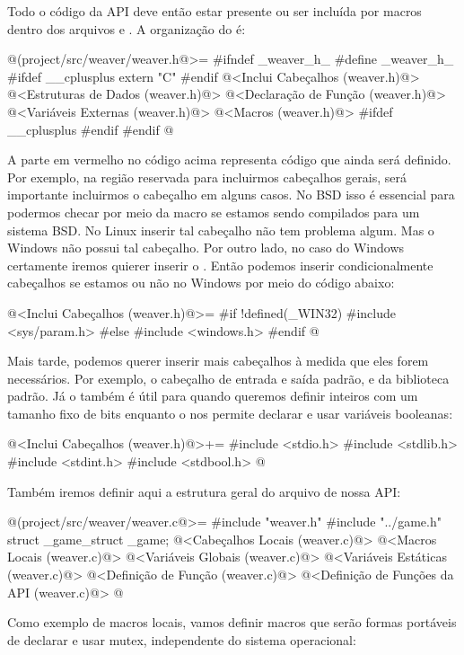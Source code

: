 Todo o código da API deve então estar presente ou ser incluída por
macros dentro dos arquivos 
e . A organização do  é:

\iniciocodigo
@(project/src/weaver/weaver.h@>=
#ifndef _weaver_h_
#define _weaver_h_
#ifdef __cplusplus
  extern "C" {
#endif
@<Inclui Cabeçalhos (weaver.h)@>
@<Estruturas de Dados (weaver.h)@>
@<Declaração de Função (weaver.h)@>
@<Variáveis Externas (weaver.h)@>
@<Macros (weaver.h)@>
#ifdef __cplusplus
  }
#endif
#endif
@
\fimcodigo

A parte em vermelho no código acima representa código que ainda será
definido. Por exemplo, na região reservada para incluirmos cabeçalhos
gerais, será importante incluirmos o
cabeçalho  em alguns casos. No BSD isso é
essencial para podermos checar por meio da macro se estamos sendo
compilados para um sistema BSD. No Linux inserir tal cabeçalho não tem
problema algum. Mas o Windows não possui tal cabeçalho. Por outro
lado, no caso do Windows certamente iremos quierer inserir
o . Então podemos inserir condicionalmente
cabeçalhos se estamos ou não no Windows por meio do código abaixo:

\iniciocodigo
@<Inclui Cabeçalhos (weaver.h)@>=
#if !defined(_WIN32)
#include <sys/param.h>
#else
#include <windows.h>
#endif
@
\fimcodigo

Mais tarde, podemos querer inserir mais cabeçalhos à medida que eles
forem necessários. Por exemplo, o cabeçalho de entrada e saída padrão,
e da biblioteca padrão. Já o  também é útil para
quando queremos definir inteiros com um tamanho fixo de bits enquanto
o  nos permite declarar e usar variáveis
booleanas:

\iniciocodigo
@<Inclui Cabeçalhos (weaver.h)@>+=
#include <stdio.h>
#include <stdlib.h>
#include <stdint.h>
#include <stdbool.h>
@
\fimcodigo

Também iremos definir aqui a estrutura geral do
arquivo  de nossa API:

\iniciocodigo
@(project/src/weaver/weaver.c@>=
#include "weaver.h"
#include "../game.h"
struct _game_struct _game;
@<Cabeçalhos Locais (weaver.c)@>
@<Macros Locais (weaver.c)@>
@<Variáveis Globais (weaver.c)@>
@<Variáveis Estáticas (weaver.c)@>
@<Definição de Função (weaver.c)@>
@<Definição de Funções da API (weaver.c)@>
@
\fimcodigo

Como exemplo de macros locais, vamos definir macros que serão formas
portáveis de declarar e usar mutex, independente do sistema
operacional:

